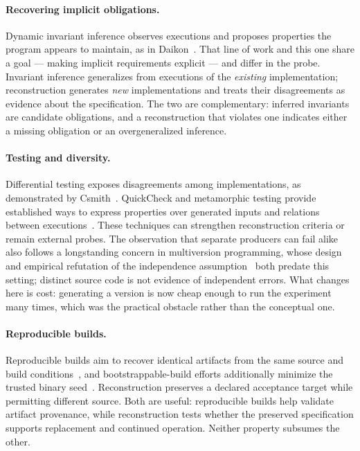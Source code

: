 \documentclass[10pt,twocolumn,letterpaper]{article}
\begin{document}
\paragraph{Recovering implicit obligations.} Dynamic invariant inference observes executions and proposes properties the program appears to maintain, as in Daikon~\cite{daikon}. That line of work and this one share a goal --- making implicit requirements explicit --- and differ in the probe. Invariant inference generalizes from executions of the \emph{existing} implementation; reconstruction generates \emph{new} implementations and treats their disagreements as evidence about the specification. The two are complementary: inferred invariants are candidate obligations, and a reconstruction that violates one indicates either a missing obligation or an overgeneralized inference.

\paragraph{Testing and diversity.} Differential testing exposes disagreements among implementations, as demonstrated by Csmith~\cite{csmith}. QuickCheck and metamorphic testing provide established ways to express properties over generated inputs and relations between executions~\cite{quickcheck,metamorphic}. These techniques can strengthen reconstruction criteria or remain external probes. The observation that separate producers can fail alike also follows a longstanding concern in multiversion programming, whose design~\cite{avizienis} and empirical refutation of the independence assumption~\cite{knight} both predate this setting; distinct source code is not evidence of independent errors. What changes here is cost: generating a version is now cheap enough to run the experiment many times, which was the practical obstacle rather than the conceptual one.

\paragraph{Reproducible builds.} Reproducible builds aim to recover identical artifacts from the same source and build conditions~\cite{builds}, and bootstrappable-build efforts additionally minimize the trusted binary seed~\cite{bootstrappable}. Reconstruction preserves a declared acceptance target while permitting different source. Both are useful: reproducible builds help validate artifact provenance, while reconstruction tests whether the preserved specification supports replacement and continued operation. Neither property subsumes the other.
\end{document}
